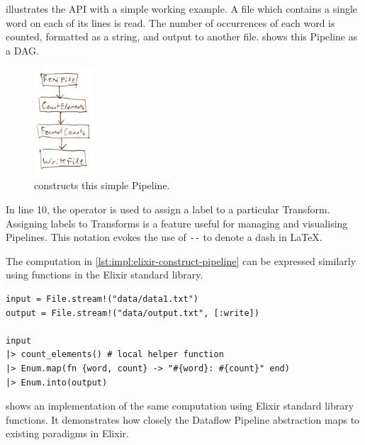  illustrates the API with a simple working example.
A file which contains a single word on each of its lines is read.
The number of occurrences of each word is counted, formatted as a string, and output to another file.
 shows this Pipeline as a DAG.

\begin{figure}[h]
	\centering
	\includegraphics[width=0.2\textwidth]{images/temp/dsl-simple-pipeline}
	\caption[A simple Pipeline constructed in \cref{lst:impl:elixir-construct-pipeline}.]{ constructs this simple Pipeline.}
	\label{fig:impl:dsl-simple-pipeline}
\end{figure}

In line 10, the \exs{--} operator is used to assign a label to a particular Transform.
Assigning labels to Transforms is a feature useful for managing and visualising Pipelines.
This notation evokes the use of \verb|--| to denote a dash in \LaTeX.

\begin{listing}[h]
	\caption[An implementation of the computation in \cref{lst:impl:elixir-construct-pipeline} using standard sequential functions.]{The computation in \cref{lst:impl:elixir-construct-pipeline} can be expressed similarly using functions in the Elixir standard library.}
	\label{lst:impl:elixir-normal-comparison}
	\begin{verbatim}
input = File.stream!("data/data1.txt")
output = File.stream!("data/output.txt", [:write])

input
|> count_elements() # local helper function
|> Enum.map(fn {word, count} -> "#{word}: #{count}" end)
|> Enum.into(output)
	\end{verbatim}
\end{listing}

 shows an implementation of the same computation using Elixir standard library functions.
It demonstrates how closely the Dataflow Pipeline abstraction maps to existing paradigms in Elixir.

